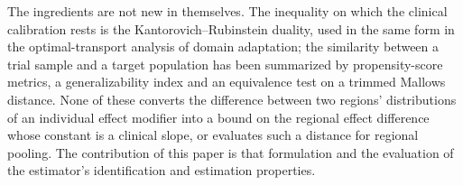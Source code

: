 \documentclass[AMA,Times1COL]{WileyNJDv5}
\begin{document}
The ingredients are not new in themselves. The inequality on which the clinical calibration rests is the Kantorovich--Rubinstein duality, used in the same form in the optimal-transport analysis of domain adaptation;\cite{shen2018,redko2017} the similarity between a trial sample and a target population has been summarized by propensity-score metrics,\cite{stuart2011} a generalizability index\cite{tipton2014} and an equivalence test on a trimmed Mallows distance.\cite{munk1998} None of these converts the difference between two regions' distributions of an individual effect modifier into a bound on the regional effect difference whose constant is a clinical slope, or evaluates such a distance for regional pooling. The contribution of this paper is that formulation and the evaluation of the estimator's identification and estimation properties.


\end{document}
